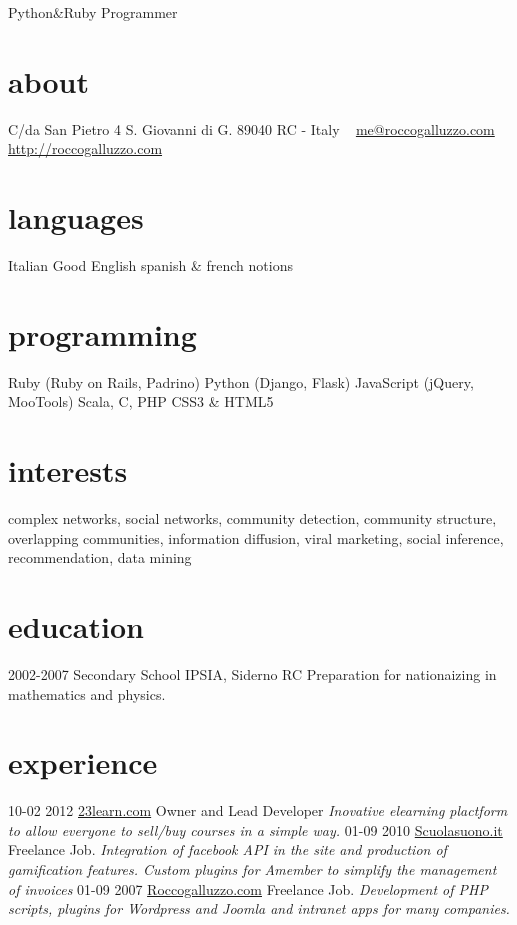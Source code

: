 \documentclass[]{cv}
\begin{document}
       {Python\&Ruby Programmer}

\begin{aside}
  \section{about}
    C/da San Pietro 4
    S. Giovanni di G.
    89040 RC - Italy
    ~
    \href{mailto:me@roccogalluzzo.com}{me@roccogalluzzo.com}
    \href{http://roccogalluzzo.com}{http://roccogalluzzo.com}
  \section{languages}
    Italian
    Good English 
    spanish \& french notions
  \section{programming}
    Ruby
    (Ruby on Rails, Padrino)
    Python
    (Django, Flask)
    JavaScript
    (jQuery, MooTools)
    Scala, C, PHP
    CSS3 \& HTML5
\end{aside}

\section{interests}

complex networks, social networks, community detection, community structure,
overlapping communities, information diffusion, viral marketing, social
inference, recommendation, data mining

\section{education}

\begin{entrylist}

  \entry
    {2002-2007}
    {Secondary School}
    {IPSIA, Siderno RC}
    {Preparation for nationaizing in mathematics and physics.}

\end{entrylist}

\section{experience}

\begin{entrylist}
  \entry
    {10-02 2012}
     {\href{http://www.23learn.com}{23learn.com}}
    {Owner and Lead Developer}
    {\emph{Inovative elearning plactform to allow everyone to sell/buy courses in a simple way. }}
  \entry
    {01-09 2010}
    {\href{http://www.scuolasuono.it}{Scuolasuono.it}}
    {Freelance Job.}
    {\emph{Integration of facebook API in the site and production of gamification features. Custom plugins for Amember to simplify the management of invoices}}
  \entry
    {01-09 2007}
    {\href{http://roccogalluzzo.com}{Roccogalluzzo.com}}
    {Freelance Job.}
    {\emph{Development of PHP scripts, plugins for Wordpress and Joomla and intranet apps for many companies.}}
\end{entrylist}
\end{document}
